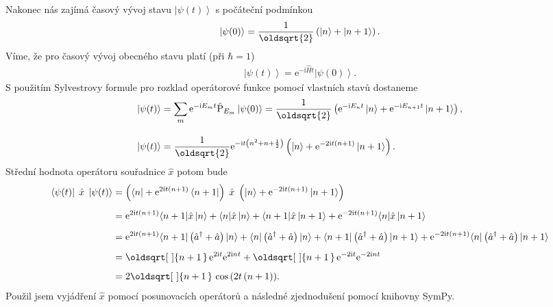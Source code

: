 \documentclass[10pt,a4paper]{article}
\renewcommand*{\sqrt}[2][\ ]{\oldsqrt[#1]{#2\,}\,}
\newcommand{\const}[1]{\text{#1}}
\newcommand{\bra}[1]{\left< #1 \right|}
\newcommand{\ket}[1]{\left| #1 \right>}
\newcommand{\e}[1]{\const{e}^{#1}}
\renewcommand{\i}{\const{i}}
\begin{document}
Nakonec nás zajímá časový vývoj stavu $\ket{\psi(t)}$ s počáteční podmínkou
\begin{align*}
    \ket{\psi(0)} =
    \frac{1}{\oldsqrt{2}}
    \left( \ket{n} + \ket{n+1} \right).
\end{align*}
Víme, že pro časový vývoj obecného stavu platí (při $\hbar = 1$)
\begin{align*}
    \ket{\psi(t)} = \e{-\i \hat{H} t} \ket{\psi(0)}.
\end{align*}
S použitím Sylvestrovy formule pro rozklad operátorové funkce pomocí vlastních stavů dostaneme
\begin{align*}
    \ket{\psi(t)} &= \sum_m \e{-\i E_m t} \hat{\const{P}}_{E_m} \ket{\psi(0)} = \frac{1}{\oldsqrt{2}} \left(\e{-\i E_n t} \ket{n} + \e{-\i E_{n+1} t} \ket{n+1}\right),
    \\[10pt]
    \ket{\psi(t)} &= \frac{1}{\oldsqrt{2}} \e{-\i t \left(n^{2} + n + \frac{1}{2}\right)} \left(\ket{n} + \e{-2 \i t \left(n + 1\right)} \ket{n+1}\right).
\end{align*}
Střední hodnota operátoru souřadnice $\hat{x}$ potom bude
\begin{align*}
    \bra{\psi(t)} \; \hat{x} \; \ket{\psi(t)}
    &= \left(\bra{n} + \e{2 \i t \left(n + 1\right)} \bra{n+1}\right) \; \hat{x} \; \left(\ket{n} + \e{-2 \i t \left(n + 1\right)} \ket{n+1}\right)
    \\[5pt]
    &= \e{2 \i t \left(n + 1\right)} {\left\langle n + 1\right|} \hat{x} \ket{n} + {\left\langle n\right|} \hat{x} \ket{n} + {\left\langle n + 1\right|} \hat{x} \ket{n+1} + \e{- 2 \i t \left(n + 1\right)} {\left\langle n\right|} \hat{x} \ket{n+1}
    \\[5pt]
    &= \e{2 \i t \left(n + 1\right)} {\left\langle n + 1\right|} \left(\hat{a}^{\dagger} + \hat{a}\right) \ket{n} + {\left\langle n\right|} \left(\hat{a}^{\dagger} + \hat{a}\right) \ket{n} + {\left\langle n + 1\right|} \left(\hat{a}^{\dagger} + \hat{a}\right) \ket{n+1} + \e{- 2 \i t \left(n + 1\right)} {\left\langle n\right|} \left(\hat{a}^{\dagger} + \hat{a}\right) \ket{n+1}
    \\[5pt]
    &= \sqrt{n + 1} \e{2 \i t} \e{2 \i n t} + \sqrt{n + 1} \e{- 2 \i t} \e{- 2 \i n t}
    \\[5pt]
    &= 2 \sqrt{n + 1} \cos{\left(2 t \left(n + 1\right) \right)}.
\end{align*}
Použil jsem vyjádření $\hat{x}$ pomocí posunovacích operátorů a následné zjednodušení pomocí knihovny SymPy.
\end{document}
